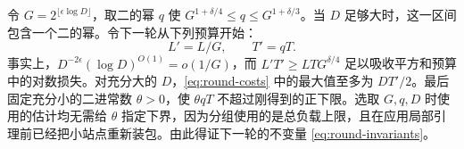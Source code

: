 令 $G=2^{\lfloor\epsilon\log D\rfloor}$，取二的幂 $q$ 使 $G^{1+\delta/4}\le q\le G^{1+\delta/3}$。当 $D$ 足够大时，这一区间包含一个二的幂。令下一轮从下列预算开始：\begin{equation}\label{eq:round-target}
                 L'=L/G,\qquad T'=qT .
\end{equation} 事实上，$D^{-2\epsilon}(\log D)^{O(1)}=o(1/G)$，而 $L'T'\ge LTG^{\delta/4}$ 足以吸收平方和预算中的对数损失。对充分大的 $D$，\eqref{eq:round-costs} 中的最大值至多为 $DT'/2$。最后固定充分小的二进常数 $\theta>0$，使 $\theta qT$ 不超过刚得到的正下限。选取 $G,q,D$ 时使用的估计均无需给 $\theta$ 指定下界，因为分组使用的是总负载上限，且在应用局部引理前已经把小站点重新装包。由此得证下一轮的不变量 \eqref{eq:round-invariants}。


